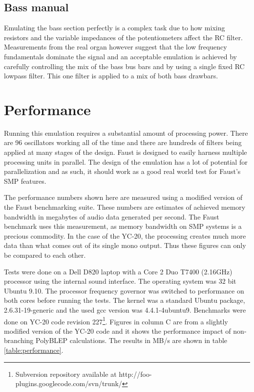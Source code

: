 \documentclass[11pt,a4paper]{article}
\begin{document}
\subsection{Bass manual}

Emulating the bass section perfectly is a complex task due to how mixing resistors and the variable impedances of the potentiometers affect the RC filter. Measurements from the real organ however suggest that the low frequency fundamentals dominate the signal and an acceptable emulation is achieved by carefully controlling the mix of the bass bus bars and by using a single fixed RC lowpass filter. This one filter is applied to a mix of both bass drawbars.

\section{Performance}
\label{section:performance}

Running this emulation requires a substantial amount of processing power. There are 96 oscillators working all of the time and there are hundreds of filters being applied at many stages of the design. Faust is designed to easily harness multiple processing units in parallel. The design of the emulation has a lot of potential for parallelization and as such, it should work as a good real world test for Faust's SMP features.

The performance numbers shown here are measured using a modified version of the Faust benchmarking suite. These numbers are estimates of achieved memory bandwidth in megabytes of audio data generated per second. The Faust benchmark uses this measurement, as memory bandwidth on SMP systems is a precious commodity. In the case of the YC-20, the processing creates much more data than what comes out of its single mono output. Thus these figures can only be compared to each other.

Tests were done on a Dell D820 laptop with a Core 2 Duo T7400 (2.16GHz) processor using the internal sound interface. The operating system was 32 bit Ubuntu 9.10. The processor frequency governor was switched to performance on both cores before running the tests. The kernel was a standard Ubuntu package, 2.6.31-19-generic and the used gcc version was 4.4.1-4ubuntu9. Benchmarks were done on YC-20 code revision 227\footnote{Subversion repository available at http://foo-plugins.googlecode.com/svn/trunk/}. Figures in column C are from a slightly modified version of the YC-20 code and it shows the performance impact of non-branching PolyBLEP calculations. The results in MB/s are shown in table \ref{table:performance}.
\end{document}

